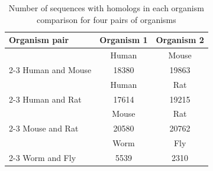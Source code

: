 \begin{table}[h]

\caption[Number of sequences with homologs in each organism comparison ]{Number of sequences with homologs in each organism comparison for four pairs of organisms }

	\begin{tabular}{| l | c | c |}
		\hline
		Organism pair & Organism 1 & Organism 2 \\
		\hline
		& Human & Mouse\\
		\cline{2-3}
		Human and Mouse & 18380 & 19863\\
		\hline
		& Human & Rat\\
		\cline{2-3}
		Human and Rat & 17614 & 19215\\
		\hline
		& Mouse & Rat\\
		\cline{2-3}
		Mouse and Rat & 20580 & 20762\\
		\hline
		& Worm & Fly\\
		\cline{2-3}		
		Worm and Fly & 5539 & 2310\\
		\hline		
	\end{tabular}
\label{tab:ochomocounts}
\end{table}